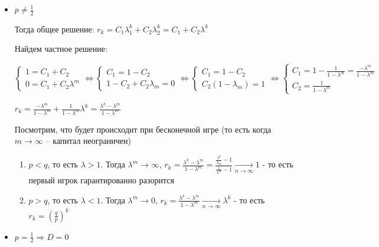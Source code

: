\documentclass[12pt]{article}
\begin{document}
    \begin{itemize}
        \item $p \neq \frac{1}{2}$

        Тогда общее решение: $r_k = C_1 \lambda_1^k + C_2 \lambda_2^k = C_1 + C_2 \lambda^k$

        Найдем частное решение:

        $\begin{cases}
            1 = C_1 + C_2 \\
            0 = C_1 + C_2 \lambda^m
        \end{cases} \Longleftrightarrow \begin{cases}
            C_1 = 1 - C_2 \\
            1 - C_2 + C_2 \lambda_m = 0
        \end{cases} \Longleftrightarrow \begin{cases}
            C_1 = 1 - C_2 \\
            C_2 (1 - \lambda_m) = 1
        \end{cases} \Longleftrightarrow \begin{cases}
            C_1 = 1 - \frac{1}{1 - \lambda^m} = \frac{-\lambda^m}{1 - \lambda^m} \\
            C_2 = \frac{1}{1 - \lambda^m}
        \end{cases}$

        $r_k = \frac{-\lambda^m}{1 - \lambda^m} + \frac{1}{1 - \lambda^m} \lambda^k = \frac{\lambda^k - \lambda^m}{1 - \lambda^m}$

        Посмотрим, что будет происходит при бесконечной игре (то есть когда $m \to \infty$ -- капитал неограничен)

        \begin{enumerate}
            \item $p < q$, то есть $\lambda > 1$. Тогда $\lambda^m \to \infty$, $r_k = \frac{\lambda^k - \lambda^m}{1 - \lambda^m} = \frac{\frac{\lambda^k}{\lambda_m} - 1}{\frac{1}{\lambda^m} - 1} \underset{n \to \infty}{\longrightarrow} 1$ - 
            то есть первый игрок гарантированно разорится

            \item $p > q$, то есть $\lambda < 1$. Тогда $\lambda^m \to 0$, $r_k = \frac{\lambda^k - \lambda^m}{1 - \lambda^m} \underset{n \to \infty}{\longrightarrow} \lambda^k$ - 
            то есть $r_k = \left(\frac{q}{p}\right)^k$
        \end{enumerate}

        \item $p = \frac{1}{2} \Longrightarrow D = 0$ 


\end{itemize}
\end{document}
